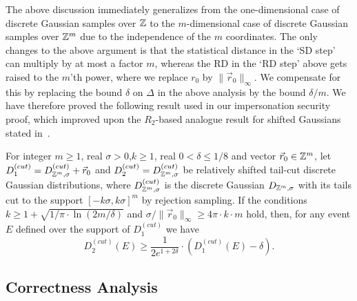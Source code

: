 The above discussion immediately generalizes from the one-dimensional case of discrete Gaussian samples over $\mathbb{Z}$ to the $m$-dimensional case of discrete Gaussian samples over $\mathbb{Z}^m$ due to the independence of the $m$ coordinates. The only changes to the above argument is that the statistical distance in the `SD step' can multiply by at most a factor $m$, whereas the RD in the `RD step' above gets raised to the $m$'th power, where we replace $r_0$ by $\|\vec{r}_0\|_{\infty}$. We compensate for this by replacing the bound $\delta$ on $\Delta$ in the above analysis by the bound $\delta/m$. We have therefore proved the following result used in our impersonation security proof, which improved upon the $R_2$-based analogue result for shifted Gaussians stated in~\cite{langlois2014gghlite}.


\begin{lemma} \label{le:Renyi}
For integer $m \geq 1$, real $\sigma>0$,$k \geq 1$, real $0<\delta \leq 1/8$ and vector $\vec{r}_0 \in \mathbb{Z}^m$, let $D_1^{(cut)} = D_{\mathbb{Z}^m,\sigma}^{(cut)} + \vec{r}_0$ and $D_2^{(cut)} = D_{\mathbb{Z}^m,\sigma}^{(cut)}$ be relatively shifted tail-cut discrete Gaussian distributions, where $D_{\mathbb{Z}^m,\sigma}^{(cut)}$ is the discrete Gaussian $D_{\mathbb{Z}^m,\sigma}$ with its tails cut to the support $[-k\sigma,k\sigma]^m$ by rejection sampling. If the conditions
$k \geq 1 + \sqrt{1/\pi \cdot \ln(2m/\delta)}$ and $\sigma/\|\vec{r}_0\|_{\infty} \geq 4 \pi \cdot k \cdot m$ hold, then, for any event $E$ defined over the support of $D_1^{(cut)}$ we have
$$
D_2^{(cut)}(E) \geq \frac{1}{2e^{1+2\delta}} \cdot \left(D_1^{(cut)}(E) - \delta\right).
$$
\end{lemma}

\subsection{Correctness Analysis}
\label{sec:2correctness}

